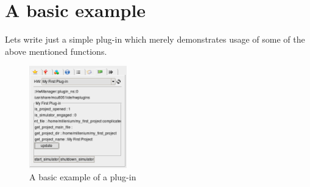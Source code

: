 \documentclass[a4paper,twoside,12pt]{book}
\begin{document}
	\section{A basic example}
		Lets write just a simple plug-in which merely demonstrates usage of some of the above mentioned functions.
		\begin{figure}[h!]
			\centering{}
			\includegraphics[width=120pt]{img/029.png}
			\caption{A basic example of a plug-in}
		\end{figure}
\end{document}

